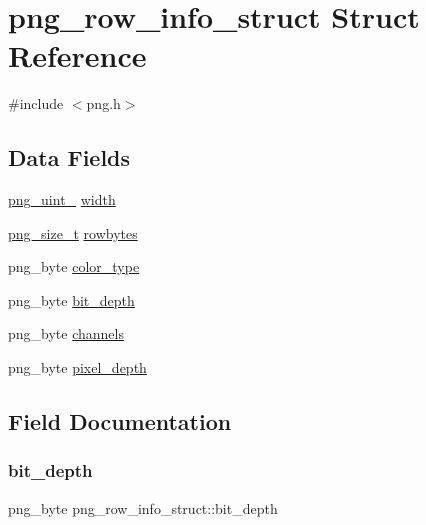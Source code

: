 \hypertarget{structpng__row__info__struct}{}\section{png\+\_\+row\+\_\+info\+\_\+struct Struct Reference}
\label{structpng__row__info__struct}


{\ttfamily \#include $<$png.\+h$>$}

\subsection*{Data Fields}
\begin{DoxyCompactItemize}
\item 
\hyperlink{libpng16_2pngconf_8h_aed373ad2e16fd6df7ccfa96329441d0d}{png\+\_\+uint\+\_} \hyperlink{structpng__row__info__struct_a1ab107da5ffee8100eeaa76cc5ba3e62}{width}
\item 
\hyperlink{libpng16_2pngconf_8h_a975e35d0a699ea3b08b8feef90fd29eb}{png\+\_\+size\+\_\+t} \hyperlink{structpng__row__info__struct_a924a208653f2577c05db5e1cf3aa5817}{rowbytes}
\item 
png\+\_\+byte \hyperlink{structpng__row__info__struct_a646244422549c66e6661cfcdb67c8e28}{color\+\_\+type}
\item 
png\+\_\+byte \hyperlink{structpng__row__info__struct_a6b14d5d0cc32f151c28c568cf1c1f82d}{bit\+\_\+depth}
\item 
png\+\_\+byte \hyperlink{structpng__row__info__struct_a7cefee70361a3789a862001aefcd872f}{channels}
\item 
png\+\_\+byte \hyperlink{structpng__row__info__struct_a70b84917ef9eabc9b7d29ec96fd01153}{pixel\+\_\+depth}
\end{DoxyCompactItemize}


\subsection{Field Documentation}
\mbox{\label{structpng__row__info__struct_a6b14d5d0cc32f151c28c568cf1c1f82d}} 
\subsubsection{\texorpdfstring{bit\+\_\+depth}{bit\_depth}}
{\footnotesize\ttfamily png\+\_\+byte png\+\_\+row\+\_\+info\+\_\+struct\+::bit\+\_\+depth}

